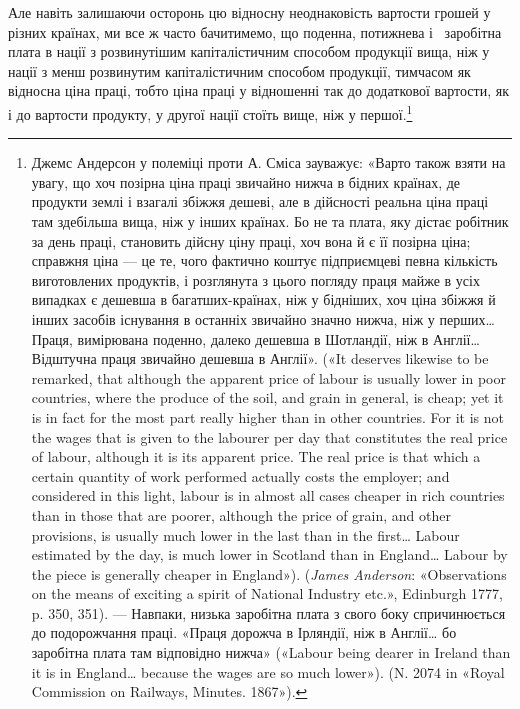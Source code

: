 Але навіть залишаючи осторонь цю відносну неоднаковість
вартости грошей у різних країнах, ми все ж часто бачитимемо,
що поденна, потижнева і~ заробітна плата в нації з розвинутішим
капіталістичним способом продукції вища, ніж у нації
з менш розвинутим капіталістичним способом продукції, тимчасом
як відносна ціна праці, тобто ціна праці у відношенні
так до додаткової вартости, як і до вартости продукту, у другої
нації стоїть вище, ніж у першої.\footnote{
Джемс Андерсон у полеміці проти А. Сміса зауважує: «Варто
також взяти на увагу, що хоч позірна ціна праці звичайно нижча в бідних
країнах, де продукти землі і взагалі збіжжя дешеві, але в дійсності
реальна ціна праці там здебільша вища, ніж у інших країнах. Бо не та
плата, яку дістає робітник за день праці, становить дійсну ціну праці,
хоч вона й є її позірна ціна; справжня ціна — це те, чого фактично коштує
підприємцеві певна кількість виготовлених продуктів, і розглянута з
цього погляду праця майже в усіх випадках є дешевша в багатших-країнах,
ніж у бідніших, хоч ціна збіжжя й інших засобів існування в останніх
звичайно значно нижча, ніж у перших\dots{} Праця, вимірювана поденно,
далеко дешевша в Шотландії, ніж в Англії\dots{} Відштучна праця звичайно
дешевша в Англії». («It deserves likewise to be remarked, that although the
apparent price of labour is usually lower in poor countries, where the
produce of the soil, and grain in general, is cheap; yet it is in fact for the
most part really higher than in other countries. For it is not the wages that
is given to the labourer per day that constitutes the real price of labour,
although it is its apparent price. The real price is that which a certain
quantity of work performed actually costs the employer; and considered
in this light, labour is in almost all cases cheaper in rich countries than in
those that are poorer, although the price of grain, and other provisions, is
usually much lower in the last than in the first\dots{} Labour estimated by
the day, is much lower in Scotland than in England\dots{} Labour by the piece
is generally cheaper in England»). (\emph{James Anderson}: «Observations on
the means of exciting a spirit of National Industry etc.», Edinburgh 1777,
p. 350, 351). — Навпаки, низька заробітна плата з свого боку спричинюється
до подорожчання праці. «Праця дорожча в Ірляндії, ніж в Англії\dots{}
бо заробітна плата там відповідно нижча» («Labour being dearer in Ireland
than it is in England\dots{} because the wages are so much lower»).
(N. 2074 in «Royal Commission on Railways, Minutes. 1867»).
}

